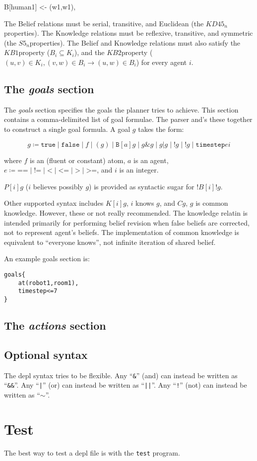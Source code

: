 \documentclass{article}
\newcommand{\kdff}{\ensuremath{KD45_n}}
\newcommand{\sfive}{\ensuremath{S5_n}}
\newcommand{\kbone}{\ensuremath{KB1}}
\newcommand{\kbtwo}{\ensuremath{KB2}}
\begin{document}
B[human1] <- {(w1,w1)},

The Belief relations must be serial, transitive, and Euclidean (the \kdff
properties). The Knowledge relations must be reflexive, transitive, and
symmetric (the \sfive properties). The Belief and Knowledge relations must also
satisfy the \kbone property ($B_i \subseteq K_i$), and the \kbtwo property
($(u,v) \in K_i, (v,w) \in B_i \rightarrow (u,w) \in B_i$) for every agent
$i$.



\subsection{The \emph{goals} section}

The \emph{goals} section specifies the goals the planner tries to achieve.
This section contains a comma-delimited list of goal formulae. The parser and's
these together to construct a single goal formula. A goal $g$ takes the form:

$$
g \coloneq
\texttt{true}      \mid
\texttt{false}     \mid
f         \mid
(g)       \mid
\texttt{B}[a]g     \mid
g \& g     \mid
g | g     \mid
!g        \mid
!g        \mid
\texttt{timestep} e i
$$

\noindent
where $f$ is an (fluent or constant) atom, $a$ is an agent, 
$e \coloneq
\texttt{==} \mid
\texttt{!=} \mid
\texttt{<} \mid
\texttt{<=} \mid
\texttt{>} \mid
\texttt{>=}
$, and $i$ is an integer.

$P[i]g$ ($i$ believes possibly $g$) is provided as syntactic sugar for
$!B[i]!g$.

Other supported syntax includes $K[i]g$, $i$ knows $g$, and $Cg$, $g$ is common
knowledge. However, these or not really recommended. The knowledge relatin is
intended primarily for performing belief revision when false beliefs are
corrected, not to represent agent's beliefs. The implementation of common
knowledge is equivalent to ``everyone knows'', not infinite iteration of shared
belief.

An example goals section is:
\begin{verbatim}
goals{
    at(robot1,room1),
    timestep<=7
}
\end{verbatim}


\subsection{The \emph{actions} section}

\subsection{Optional syntax}

The depl syntax tries to be flexible.
Any
``\texttt{\&}''
(and) can instead be written as
``\texttt{\&\&}''.
Any
``\texttt{|}''
(or) can instead be written as
``\texttt{||}''.
Any
``\texttt{!}''
(not) can instead be written as
``$\sim$''.


\section{Test}
The best way to test a depl file is with the \verb|test| program.
\end{document}

